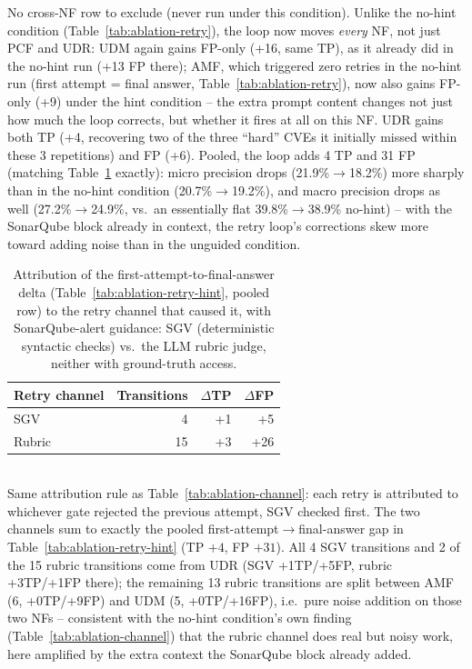 \begin{table}[t]
\footnotesize{No cross-NF row to exclude (never run under this condition). Unlike the no-hint condition (Table~\ref{tab:ablation-retry}), the loop now moves \emph{every} NF, not just PCF and UDR: UDM again gains FP-only (+16, same TP), as it already did in the no-hint run (+13 FP there); AMF, which triggered zero retries in the no-hint run (first attempt = final answer, Table~\ref{tab:ablation-retry}), now also gains FP-only (+9) under the hint condition -- the extra prompt content changes not just how much the loop corrects, but whether it fires at all on this NF. UDR gains both TP (+4, recovering two of the three ``hard'' CVEs it initially missed within these 3 repetitions) and FP (+6). Pooled, the loop adds 4 TP and 31 FP (matching Table~\ref{tab:ablation-channel-hint} exactly): micro precision drops (21.9\%$\to$18.2\%) more sharply than in the no-hint condition (20.7\%$\to$19.2\%), and macro precision drops as well (27.2\%$\to$24.9\%, vs.\ an essentially flat 39.8\%$\to$38.9\% no-hint) -- with the SonarQube block already in context, the retry loop's corrections skew more toward adding noise than in the unguided condition.}
\end{table}

\begin{table}[t]
\centering
\caption{Attribution of the first-attempt-to-final-answer delta (Table~\ref{tab:ablation-retry-hint}, pooled row) to the retry channel that caused it, with SonarQube-alert guidance: SGV (deterministic syntactic checks) vs.\ the LLM rubric judge, neither with ground-truth access.}
\label{tab:ablation-channel-hint}
\begin{tabular}{lrrr}
\toprule
Retry channel & Transitions & $\Delta$TP & $\Delta$FP \\
\midrule
SGV     & 4  & +1 & +5  \\
Rubric  & 15 & +3 & +26 \\
\bottomrule
\end{tabular}
\\[2pt]
\footnotesize{Same attribution rule as Table~\ref{tab:ablation-channel}: each retry is attributed to whichever gate rejected the previous attempt, SGV checked first. The two channels sum to exactly the pooled first-attempt$\to$final-answer gap in Table~\ref{tab:ablation-retry-hint} (TP $+4$, FP $+31$). All 4 SGV transitions and 2 of the 15 rubric transitions come from UDR (SGV +1TP/+5FP, rubric +3TP/+1FP there); the remaining 13 rubric transitions are split between AMF (6, +0TP/+9FP) and UDM (5, +0TP/+16FP), i.e.\ pure noise addition on those two NFs -- consistent with the no-hint condition's own finding (Table~\ref{tab:ablation-channel}) that the rubric channel does real but noisy work, here amplified by the extra context the SonarQube block already added.}
\end{table}

